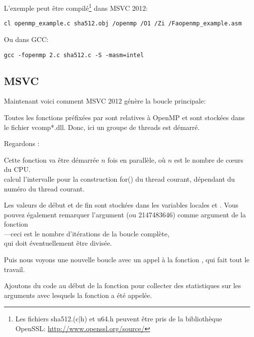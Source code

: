 L'exemple peut être compilé\footnote{Les fichiers sha512.(c|h) et u64.h peuvent être
pris de la bibliothèque OpenSSL:
\url{http://www.openssl.org/source/}}
dans MSVC 2012:

\begin{lstlisting}
cl openmp_example.c sha512.obj /openmp /O1 /Zi /Faopenmp_example.asm
\end{lstlisting}

Ou dans GCC:

\begin{lstlisting}
gcc -fopenmp 2.c sha512.c -S -masm=intel
\end{lstlisting}

\subsection{MSVC}

Maintenant voici comment MSVC 2012 génère la boucle principale:



Toutes les fonctions préfixées par  sont relatives à OpenMP et sont stockées
dans le fichier vcomp*.dll.
Donc, ici un groupe de threads est démarré.

Regardons :



Cette fonction va être démarrée $n$ fois en parallèle, où $n$ est le nombre de c\oe{}urs
du \ac{CPU}.\\
calcul l'intervalle pour la construction for() du thread courant, dépendant du numéro
du thread courant.

Les valeurs de début et de fin sont stockées dans les variables locales 
et .
Vous pouvez également remarquer l'argument  (ou 2147483646) comme argument
de la fonction\\
---ceci est le nombre d'itérations
de la boucle complète,\\
 qui doit éventuellement être divisée.

Puis nous voyons une nouvelle boucle avec un appel à la fonction ,
qui fait tout le travail.

Ajoutons du code au début de la fonction  pour collecter des statistiques
sur les arguments avec lesquels la fonction a été appelée.

